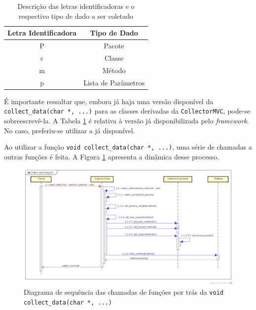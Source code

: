 \begin{table}[h]
\centering
\caption{Descrição das letras identificadoras e o respectivo tipo de dado a ser coletado}
\label{reference-format-collect-data}
\begin{tabular}{@{}cc@{}}
\toprule
\textbf{Letra Identificadora} & \textbf{Tipo de Dado}        \\ \toprule
P                             & Pacote                       \\ \hline
c                             & Classe                       \\ \hline
m                             & Método                       \\ \hline
p                             & Lista de Parâmetros          \\ \hline
\end{tabular}
\end{table}

É importante ressaltar que, embora já haja uma versão disponível da
\lstinline|collect_data(char *, ...)| para as classes derivadas da
\lstinline|CollectorMVC|, pode-se sobreescrevê-la. A Tabela
\ref{reference-format-collect-data} é relativa à versão já disponibilizada
pelo \textit{framework}. No caso, preferiu-se utilizar a já disponível.

Ao utilizar a função \lstinline|void collect_data(char *, ...)|, uma série
de chamadas a outras funções é feita. A Figura \ref{collect-data-sequence-diagram}
apresenta a dinâmica desse processo.
\begin{landscape}
\begin{figure}[h]
  \centering
    \includegraphics[width=1.5\textwidth, height=\textheight]{figuras/collect-data-sequence-diagram.png}
    \caption{Diagrama de sequência das chamadas de funções por trás da \lstinline|void collect_data(char *, ...)|}
    \label{collect-data-sequence-diagram}
\end{figure}
\FloatBarrier
\end{landscape}


